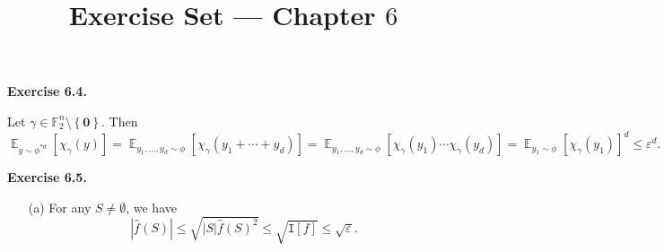 \documentclass[a4paper]{article}
\title{Exercise Set --- Chapter $6$}
\date{}
\newenvironment{exercise}[1]{
	\par
	\noindent\textbf{Exercise #1.}\quad
}{
	\par
	\bigskip
}
\DeclareMathOperator*{\E}{\mathbb E}
\newcommand{\eps}{\varepsilon}
\newcommand{\abs}[1]{{\left| #1 \right|}}
\newcommand{\cbra}[1]{{\left\{ #1 \right\}}}
\newcommand{\sbra}[1]{{\left[ #1 \right]}}
\newcommand{\Fbb}{\mathbb{F}}
\newcommand{\Itt}{\mathtt{I}}
\begin{document}
\maketitle

\begin{exercise}{6.4}
    Let $\gamma\in\Fbb_2^n\setminus\cbra{\bm 0}$. Then
    $$
    \E_{y\sim\phi^{*d}}\sbra{\chi_\gamma(y)}
    =\E_{y_1,\ldots,y_d\sim\phi}\sbra{\chi_\gamma(y_1+\cdots+y_d)}
    =\E_{y_1,\ldots,y_d\sim\phi}\sbra{\chi_\gamma(y_1)\cdots\chi_\gamma(y_d)}
    =\E_{y_1\sim\phi}\sbra{\chi_\gamma(y_1)}^d
    \leq\eps^d.
    $$
\end{exercise}

\begin{exercise}{6.5}
    \begin{itemize}
        \item[(a)] For any $S\neq\emptyset$, we have
            $$
            \abs{\hat f(S)}\leq\sqrt{|S|\hat f(S)^2}\leq\sqrt{\Itt[f]}\leq\sqrt\eps.
            $$
    \end{itemize}
\end{exercise}
\end{document}
